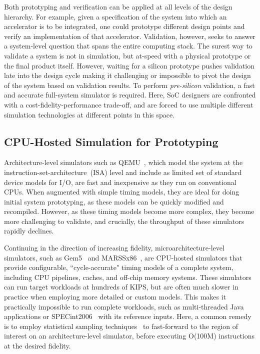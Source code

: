 Both prototyping and verification can be applied at all levels of the design
hierarchy.  For example, given a specification of the system into which an
accelerator is to be integrated, one could prototype different design points and
verify an implementation of that accelerator. Validation, however, seeks to
answer a system-level question that spans the entire computing stack.  The
surest way to validate a system is not in simulation, but at-speed with a
physical prototype or the final product itself. However, waiting for a silicon
prototype pushes validation late into the design cycle making it challenging or
impossible to pivot the design of the system based on validation results. To
perform \emph{pre-silicon} validation, a fast and accurate full-system
simulator is required. Here, SoC designers are confronted with a cost-fidelity-performance trade-off,
and are forced to use multiple different simulation technologies at different
points in this space.

\subsection{CPU-Hosted Simulation for Prototyping}\label{UArchSWSim}

Architecture-level simulators such as QEMU~\cite{QEMU}, which model the system at the
instruction-set-architecture~(ISA) level and include as limited set of standard
device models for I/O, are fast and inexpensive as they run on conventional CPUs.
When augmented with simple timing models, they are ideal for doing initial system prototyping, as
these models can be quickly modified and recompiled.
However, as these timing models become more complex, they become more
challenging to validate, and crucially, the throughput of these simulators rapidly declines.

Continuing in the direction of increasing fidelity, microarchitecture-level
simulators, such as Gem5~\cite{Gem5} and MARSSx86~\cite{MARSSx86}, are CPU-hosted 
simulators that provide configurable, ``cycle-accurate" timing models of a complete system, including CPU pipelines,
caches, and off-chip memory systems.  These simulators can run target workloads at hundreds of KIPS, but are
often much slower in practice when employing more detailed or custom models. This
makes it practically impossible to run complete workloads, such as
multi-threaded Java applications or SPECint2006~\cite{SPEC2006} with its reference
inputs. Here, a common remedy is to employ statistical sampling
techniques~\cite{smarts} to fast-forward to the region of interest on an architecture-level simulator, before
executing O(100M) instructions at the desired fidelity.

